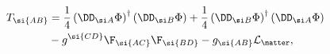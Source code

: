\begin{equation}
\begin{aligned}
T_{\si{AB}} & =\frac{1}{4} \left(\DD_{\si A} \Phi \right)^\dag
\left(\DD_{\si B}
\Phi \right) + \frac{1}{4} \left(\DD_{\si B} \Phi \right)^\dag
\left(\DD_{\si A} \Phi \right) \\
& - g^{\si{CD}} \F_{\si{AC}} \F_{\si{BD}} -
g_{\si{AB}} \mathcal{L}_{\matter},
\end{aligned}
\end{equation}


